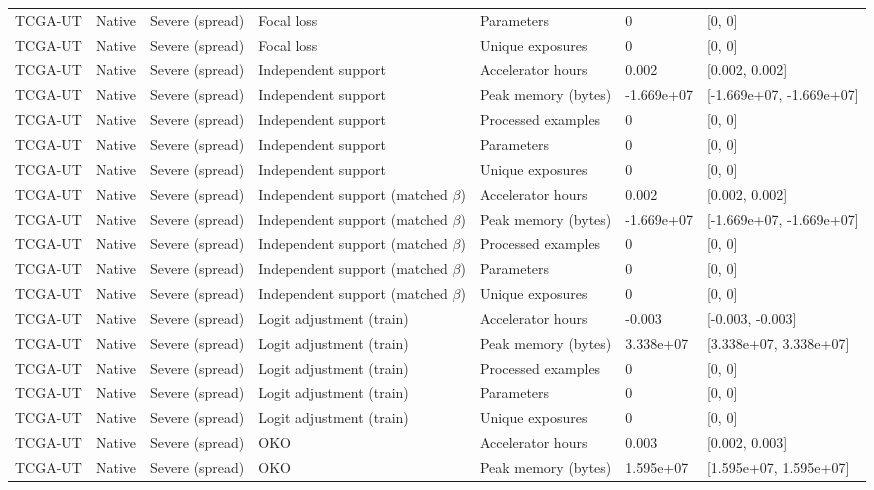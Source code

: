 \begin{longtable}{lllllll}
TCGA-UT & Native & Severe (spread) & Focal loss & Parameters & 0 & [0, 0] \\
TCGA-UT & Native & Severe (spread) & Focal loss & Unique exposures & 0 & [0, 0] \\
TCGA-UT & Native & Severe (spread) & Independent support & Accelerator hours & 0.002 & [0.002, 0.002] \\
TCGA-UT & Native & Severe (spread) & Independent support & Peak memory (bytes) & -1.669e+07 & [-1.669e+07, -1.669e+07] \\
TCGA-UT & Native & Severe (spread) & Independent support & Processed examples & 0 & [0, 0] \\
TCGA-UT & Native & Severe (spread) & Independent support & Parameters & 0 & [0, 0] \\
TCGA-UT & Native & Severe (spread) & Independent support & Unique exposures & 0 & [0, 0] \\
TCGA-UT & Native & Severe (spread) & Independent support (matched $\beta$) & Accelerator hours & 0.002 & [0.002, 0.002] \\
TCGA-UT & Native & Severe (spread) & Independent support (matched $\beta$) & Peak memory (bytes) & -1.669e+07 & [-1.669e+07, -1.669e+07] \\
TCGA-UT & Native & Severe (spread) & Independent support (matched $\beta$) & Processed examples & 0 & [0, 0] \\
TCGA-UT & Native & Severe (spread) & Independent support (matched $\beta$) & Parameters & 0 & [0, 0] \\
TCGA-UT & Native & Severe (spread) & Independent support (matched $\beta$) & Unique exposures & 0 & [0, 0] \\
TCGA-UT & Native & Severe (spread) & Logit adjustment (train) & Accelerator hours & -0.003 & [-0.003, -0.003] \\
TCGA-UT & Native & Severe (spread) & Logit adjustment (train) & Peak memory (bytes) & 3.338e+07 & [3.338e+07, 3.338e+07] \\
TCGA-UT & Native & Severe (spread) & Logit adjustment (train) & Processed examples & 0 & [0, 0] \\
TCGA-UT & Native & Severe (spread) & Logit adjustment (train) & Parameters & 0 & [0, 0] \\
TCGA-UT & Native & Severe (spread) & Logit adjustment (train) & Unique exposures & 0 & [0, 0] \\
TCGA-UT & Native & Severe (spread) & OKO & Accelerator hours & 0.003 & [0.002, 0.003] \\
TCGA-UT & Native & Severe (spread) & OKO & Peak memory (bytes) & 1.595e+07 & [1.595e+07, 1.595e+07] \\

\end{longtable}
